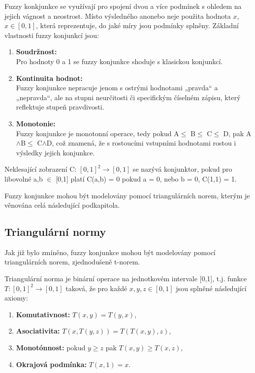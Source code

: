 Fuzzy konkjunkce se využívají pro spojení dvou a více podmínek s ohledem na jejich vágnost a neostrost. Místo výsledného \clqq ano\crqq \space nebo \clqq ne\crqq \space je použita hodnota $x$, $x \in [0,1]$, která reprezentuje, do jaké míry jsou podmínky splněny.  
Základní vlastnosti fuzzy konjunkcí jsou:
\begin{enumerate}
    \item \textbf{Soudržnost:}\\
    Pro hodnoty 0 a 1 se fuzzy konjunkce shoduje s klasickou konjunkcí.
    \item \textbf{Kontinuita hodnot:}\\
    Fuzzy konjunkce nepracuje jenom s  ostrými hodnotami „pravda“ a „nepravda“, ale na stupni neurčitosti či specifickým číselném zápisu, který reflektuje stupeň pravdivosti.
    \item \textbf{Monotonie:}\\
    Fuzzy konjunkce je monotonní operace, tedy pokud A$\leq$ B$\leq$ C$\leq$ D, pak A$\land$B$\leq$ C$\land$D, což znamená, že s rostoucími vstupními hodnotami rostou i výsledky jejich konjunkce.
\end{enumerate}
\begin{definition}
    \cite{hlinena}
    Neklesající zobrazení C: $[0,1]^2 \rightarrow [0,1]$ se nazývá konjunktor, pokud pro libovolné a,b $\in$ [0,1] platí
    C(a,b) = 0 pokud a = 0, nebo b = 0,
    C(1,1) = 1.
    \end{definition}

\begin{remark}
    Fuzzy konjunkce mohou být modelovány pomocí triangulárních norem, kterým je věnována celá následující podkapitola.
\end{remark}

\subsection{Triangul\'arn\'i normy} 

Jak již bylo zmíněno, fuzzy konjunkce mohou být modelov\' any pomocí triangulárních norem, zjednodušeně t-norem. 
\begin{definition}
\cite{hlinena}
    Triangulární norma je binární operace na jednotkovém intervale [0,1], t.j. funkce $T: [0,1]^2 \rightarrow [0,1]$ taková, že pro každé $x, y, z \in [0,1]$ jsou splněné následující axiomy:
    \begin{enumerate}
        \item \textbf{Komutativnost:} $T(x,y) = T(y,x)$,
        \item \textbf{Asociativita:} $T(x, T(y, z)) = T(T(x, y), z)$,
        \item \textbf{Monotónnost:} pokud $y \geq z$ pak $T(x, y) \geq T(x, z)$,
        \item \textbf{Okrajová podmínka:} $T(x, 1) = x$.
    \end{enumerate}
\end{definition}

